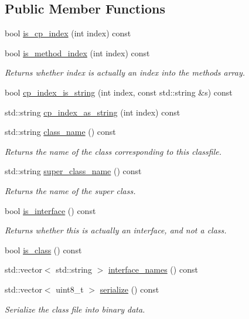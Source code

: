 \subsection*{Public Member Functions}
\begin{DoxyCompactItemize}
\item 
bool \hyperlink{classClassFileImpl_a1f15226f5107cb036e81d480531cda08}{is\+\_\+cp\+\_\+index} (int index) const
\item 
bool \hyperlink{classClassFileImpl_ad8f4fcb051aa9d8c04d67373abe12c43}{is\+\_\+method\+\_\+index} (int index) const
\begin{DoxyCompactList}\small\item\em Returns whether {\ttfamily index} is actually an index into the methods array. \end{DoxyCompactList}\item 
bool \hyperlink{classClassFileImpl_ab84cd50d25d163274a299ba682f57610}{cp\+\_\+index\+\_\+is\+\_\+string} (int index, const std\+::string \&s) const
\item 
std\+::string \hyperlink{classClassFileImpl_abf8923075c93d6d5bd1755a7b3ced362}{cp\+\_\+index\+\_\+as\+\_\+string} (int index) const
\item 
std\+::string \hyperlink{classClassFileImpl_a6b505e3750863370ca70c708d051a00c}{class\+\_\+name} () const
\begin{DoxyCompactList}\small\item\em Returns the name of the class corresponding to this classfile. \end{DoxyCompactList}\item 
std\+::string \hyperlink{classClassFileImpl_afd7229efcf341804086bcf6c00bb4820}{super\+\_\+class\+\_\+name} () const
\begin{DoxyCompactList}\small\item\em Returns the name of the super class. \end{DoxyCompactList}\item 
bool \hyperlink{classClassFileImpl_ade64e9cb17003aa71ef596785ab8c575}{is\+\_\+interface} () const
\begin{DoxyCompactList}\small\item\em Returns whether this is actually an interface, and not a class. \end{DoxyCompactList}\item 
bool \hyperlink{classClassFileImpl_a3772a57b8eaadf252a9a9f36c063ab93}{is\+\_\+class} () const
\item 
std\+::vector$<$ std\+::string $>$ \hyperlink{classClassFileImpl_ad2154cb52119b87cd74b722b69730dee}{interface\+\_\+names} () const
\item 
std\+::vector$<$ uint8\+\_\+t $>$ \hyperlink{classClassFileImpl_a4e2a4657d4b102369ba7305251d41d00}{serialize} () const
\begin{DoxyCompactList}\small\item\em Serialize the class file into binary data. \end{DoxyCompactList}\end{DoxyCompactItemize}
